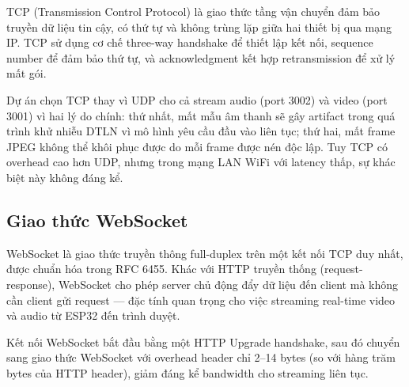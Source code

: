 TCP (Transmission Control Protocol) là giao thức tầng vận chuyển đảm bảo truyền
dữ liệu tin cậy, có thứ tự và không trùng lặp giữa hai thiết bị qua mạng IP.
TCP sử dụng cơ chế three-way handshake để thiết lập kết nối, sequence number
để đảm bảo thứ tự, và acknowledgment kết hợp retransmission để xử lý mất gói.

Dự án chọn TCP thay vì UDP cho cả stream audio (port 3002) và video (port 3001)
vì hai lý do chính: thứ nhất, mất mẫu âm thanh sẽ gây artifact trong quá trình
khử nhiễu DTLN vì mô hình yêu cầu đầu vào liên tục; thứ hai, mất frame JPEG
không thể khôi phục được do mỗi frame được nén độc lập. Tuy TCP có overhead
cao hơn UDP, nhưng trong mạng LAN WiFi với latency thấp, sự khác biệt này
không đáng kể.

\subsection{Giao thức WebSocket}

WebSocket là giao thức truyền thông full-duplex trên một kết nối TCP duy nhất,
được chuẩn hóa trong RFC 6455. Khác với HTTP truyền thống (request-response),
WebSocket cho phép server chủ động đẩy dữ liệu đến client mà không cần client
gửi request --- đặc tính quan trọng cho việc streaming real-time video và audio
từ ESP32 đến trình duyệt.

Kết nối WebSocket bắt đầu bằng một HTTP Upgrade handshake, sau đó chuyển sang
giao thức WebSocket với overhead header chỉ 2--14 bytes (so với hàng trăm bytes
của HTTP header), giảm đáng kể bandwidth cho streaming liên tục.
